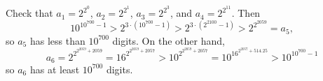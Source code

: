 Check that $a_1=2^{2^0}$, $a_2=2^{2^1}$, $a_3=2^{2^3}$, and $a_4=2^{2^{11}}$. Then
	\[
		10^{10^{700}-1}>2^{3\cdot(10^{700}-1)}>2^{3\cdot(2^{2100}-1)}>2^{2^{2059}}=a_5,
	\]
	so $a_5$ has less than $10^{700}$ digits. On the other hand,
	\[
		a_6=2^{2^{2^{2059}+2059}}=16^{2^{2^{2059}+2057}}>10^{2^{2^{2059}+2057}}=10^{16^{2^{2057}+514.25}}>10^{10^{700}-1}
	\]
	so $a_6$ has at least $10^{700}$ digits.